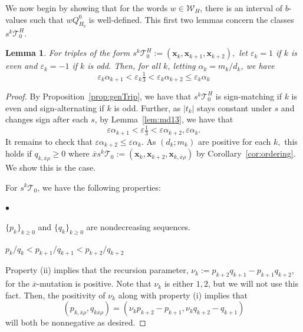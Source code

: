 \documentclass[11pt, reqno]{amsart}
\newtheorem{lemma}[thm]{Lemma}
\theoremstyle{remark}
\numberwithin{equation}{subsection}
\numberwithin{figure}{section}
\theoremstyle{customremark}
\newcommand{\Tt}{\mathcal{T}}
\newenvironment{itemlist}
   { \begin{list} {$\bullet$}
         { \setlength{\topsep}{.5ex}  \setlength{\itemsep}{.5ex} \setlength{\leftmargin}{2.5ex} } }
   { \end{list} }
\newcommand{\ovx}{{\ov{x}}}
\newcommand{\ov}{\overline}
\newcommand{\al}{{\alpha}}
\newcommand{\eps}{\varepsilon}
\begin{document}
We now begin by showing that for the words $w \in \mathcal{W}_H$, there is an interval of $b$-values such that $wQ_{H_b}^0$ is well-defined. This first two lemmas concern the classes $s^k\Tt_0^H.$
\begin{lemma} \label{lem:salphaOr}
    For triples of the form $s^k\Tt_0^H:=(\bm{x}_k,\bm{x}_{k+1},\bm{x}_{k+2}),$ let $\eps_k=1$ if $k$ is even and $\eps_k=-1$ if $k$ is odd. Then, for all $k$, letting $\al_k=m_k/d_k$, we have 
    \[\eps_k \al_{k+1} < \eps_k\tfrac{1}{3} < \eps_k\al_{k+2} \leq \eps_k \al_{k}   \]
\end{lemma}
\begin{proof}
    By Proposition~\ref{prop:genTrip}, we have that $s^k\Tt_0^H$ is sign-matching if $k$ is even and sign-alternating if $k$ is odd. Further, as $|t_k|$ stays constant under $s$ and changes sign after each $s$, by Lemma~\ref{lem:md13}, we have that \[\eps \al_{k+1} <\eps\tfrac{1}{3} < \eps\al_{k+2},\eps \al_{k}.\] It remains to check that $\eps\al_{k+2}\leq \eps \al_{k}$. As $(d_k;m_k)$ are positive for each $k,$ this holds if $q_{k,\ovx\rho} \geq 0$ where $\ov{x}s^k\Tt_0:=(\bm{x}_k,\bm{x}_{k+2},\bm{x}_{k,\ovx\rho})$ by Corollary~\ref{cor:ordering}. We show this is the case. 
    
    For $s^k\Tt_0$, we have the following properties: 
    \begin{itemlist}
        \item[{(i)}] $\{p_k\}_{k \geq 0}$ and $\{q_k\}_{k \geq 0}$ are nondecreasing sequences. 
        \item [{(ii)}] $p_k/q_k < p_{k+1}/q_{k+1} < p_{k+2}/q_{k+2}$
    \end{itemlist}
     Property (ii) implies that the recursion parameter, $\nu_k:=p_{k+2}q_{k+1}-p_{k+1}q_{k+2}$, for the $\ov{x}$-mutation is positive. Note that $\nu_k$ is either $1,2$, but we will not use this fact. Then, the positivity of $\nu_k$ along with property (i) implies that \[(p_{k,\ovx\rho},q_{k\ovx\rho})=(\nu_k p_{k+2}-p_{k+1},\nu_k q_{k+2}-q_{k+1})\] will both be nonnegative as desired. 
     
  
\end{proof}
\end{document}
